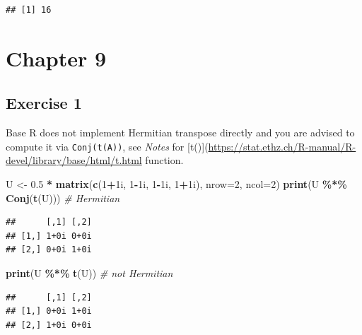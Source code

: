 \documentclass[
]{book}
\newenvironment{Shaded}{\begin{snugshade}}{\end{snugshade}}
\newcommand{\CommentTok}[1]{\textcolor[rgb]{0.56,0.35,0.01}{\textit{#1}}}
\newcommand{\DataTypeTok}[1]{\textcolor[rgb]{0.13,0.29,0.53}{#1}}
\newcommand{\DecValTok}[1]{\textcolor[rgb]{0.00,0.00,0.81}{#1}}
\newcommand{\FloatTok}[1]{\textcolor[rgb]{0.00,0.00,0.81}{#1}}
\newcommand{\KeywordTok}[1]{\textcolor[rgb]{0.13,0.29,0.53}{\textbf{#1}}}
\newcommand{\NormalTok}[1]{#1}
\newcommand{\OperatorTok}[1]{\textcolor[rgb]{0.81,0.36,0.00}{\textbf{#1}}}
\newcommand{\StringTok}[1]{\textcolor[rgb]{0.31,0.60,0.02}{#1}}
\begin{document}
\begin{verbatim}
## [1] 16
\end{verbatim}

\hypertarget{chapter-9-1}{%
\section*{Chapter 9}\label{chapter-9-1}}

\hypertarget{exercise-1-5}{%
\subsection*{Exercise 1}\label{exercise-1-5}}

Base R does not implement Hermitian transpose directly and you are advised to compute it via \texttt{Conj(t(A))}, see \emph{Notes} for {[}t(){]}(\url{https://stat.ethz.ch/R-manual/R-devel/library/base/html/t.html} function.

\begin{Shaded}
\begin{Highlighting}[]
\NormalTok{U \textless{}{-}}\StringTok{ }\FloatTok{0.5} \OperatorTok{*}\StringTok{ }\KeywordTok{matrix}\NormalTok{(}\KeywordTok{c}\NormalTok{(}\DecValTok{1}\OperatorTok{+}\NormalTok{1i, }\DecValTok{1}\OperatorTok{{-}}\NormalTok{1i, }\DecValTok{1}\OperatorTok{{-}}\NormalTok{1i, }\DecValTok{1}\OperatorTok{+}\NormalTok{1i), }\DataTypeTok{nrow=}\DecValTok{2}\NormalTok{, }\DataTypeTok{ncol=}\DecValTok{2}\NormalTok{)}
\KeywordTok{print}\NormalTok{(U }\OperatorTok{\%*\%}\StringTok{ }\KeywordTok{Conj}\NormalTok{(}\KeywordTok{t}\NormalTok{(U))) }\CommentTok{\# Hermitian}
\end{Highlighting}
\end{Shaded}

\begin{verbatim}
##      [,1] [,2]
## [1,] 1+0i 0+0i
## [2,] 0+0i 1+0i
\end{verbatim}

\begin{Shaded}
\begin{Highlighting}[]
\KeywordTok{print}\NormalTok{(U }\OperatorTok{\%*\%}\StringTok{ }\KeywordTok{t}\NormalTok{(U)) }\CommentTok{\# not Hermitian}
\end{Highlighting}
\end{Shaded}

\begin{verbatim}
##      [,1] [,2]
## [1,] 0+0i 1+0i
## [2,] 1+0i 0+0i
\end{verbatim}
\end{document}
